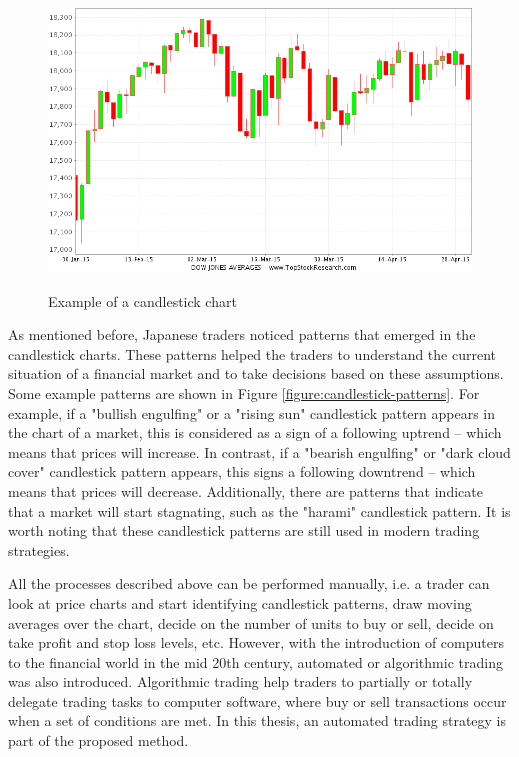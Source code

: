 \begin{figure}
\caption{Example of a candlestick chart}
\centering
\includegraphics[width=1.0\textwidth]{img/candlestick-chart.png}
\label{figure:candlestick-chart}
\end{figure}

As mentioned before, Japanese traders noticed patterns that emerged in the
candlestick charts. These patterns helped the traders to understand the current
situation of a financial market and to take decisions based on these
assumptions. Some example patterns are shown in Figure
\ref{figure:candlestick-patterns}. For example, if a "bullish engulfing" or a
"rising sun" candlestick pattern appears in the chart of a market, this is
considered as a sign of a following uptrend -- which means that prices will
increase. In contrast, if a "bearish engulfing" or "dark cloud cover"
candlestick pattern appears, this signs a following downtrend -- which means
that prices will decrease. Additionally, there are patterns that indicate that a
market will start stagnating, such as the "harami" candlestick pattern. It is
worth noting that these candlestick patterns are still used in modern trading
strategies.

All the processes described above can be performed manually, i.e. a trader can
look at price charts and start identifying candlestick patterns, draw moving
averages over the chart, decide on the number of units to buy or sell, decide on
take profit and stop loss levels, etc. However, with the introduction of
computers to the financial world in the mid 20th century, automated or
algorithmic trading was also introduced. %
Algorithmic trading help traders to partially or totally delegate trading tasks
to computer software, where buy or sell transactions occur when a set of
conditions are met. In this thesis, an automated trading strategy is part of the
proposed method.


